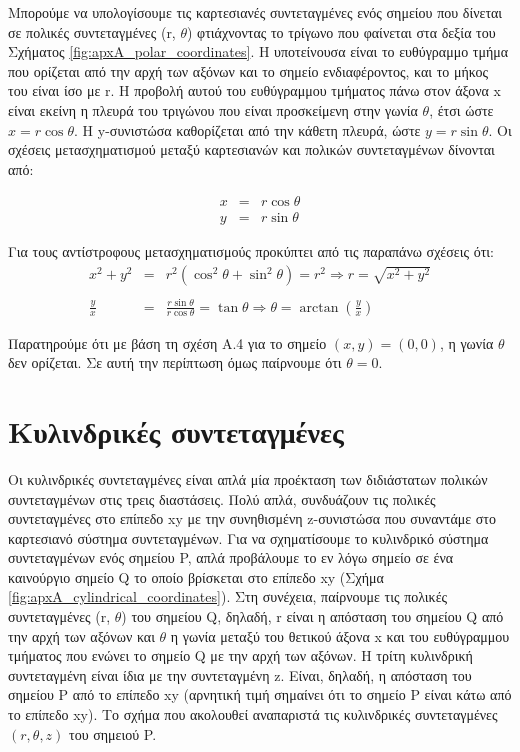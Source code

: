 Μπορούμε να υπολογίσουμε τις καρτεσιανές συντεταγμένες ενός σημείου που δίνεται σε πολικές συντεταγμένες (r, $\theta$) φτιάχνοντας το τρίγωνο που φαίνεται στα δεξία του Σχήματος \ref{fig:apxA_polar_coordinates}.  
Η υποτείνουσα είναι το ευθύγραμμο τμήμα που ορίζεται από την αρχή των αξόνων και το σημείο ενδιαφέροντος, και το μήκος του είναι ίσο με r. Η προβολή αυτού του ευθύγραμμου τμήματος πάνω στον άξονα x είναι εκείνη η πλευρά του τριγώνου που είναι προσκείμενη στην γωνία $\theta$, έτσι ώστε $x=r \cos \theta$. Η y-συνιστώσα καθορίζεται από την κάθετη πλευρά, ώστε $y=r \sin \theta$. Οι σχέσεις μετασχηματισμού μεταξύ καρτεσιανών και πολικών συντεταγμένων δίνονται από:

\begin{eqnarray}
    x &=& r \cos \theta \\
    y &=& r \sin \theta 
\end{eqnarray}

Για τους αντίστροφους μετασχηματισμούς προκύπτει από τις παραπάνω σχέσεις ότι:
\begin{eqnarray}
    x^2 + y^2 &=& r^2 (\cos^2 \theta + \sin^2 \theta) = r^2 \Rightarrow r = \sqrt{x^2 + y^2} \\ \nonumber \\
    \frac{y}{x} &=& \frac{r \sin \theta}{r \cos \theta} = \tan \theta \Rightarrow \theta = \arctan \left( \frac{y}{x} \right)
\end{eqnarray}

Παρατηρούμε ότι με βάση τη σχέση Α.4 για το σημείο $(x,y) = (0,0)$, η γωνία $\theta$ δεν ορίζεται. Σε αυτή την περίπτωση όμως παίρνουμε ότι $\theta = 0$.


\section{Κυλινδρικές συντεταγμένες}
Οι κυλινδρικές συντεταγμένες είναι απλά μία προέκταση των διδιάστατων πολικών συντεταγμένων στις τρεις διαστάσεις. Πολύ απλά, συνδυάζουν τις πολικές συντεταγμένες στο επίπεδο xy με την συνηθισμένη z-συνιστώσα που συναντάμε στο καρτεσιανό σύστημα συντεταγμένων. Για να σχηματίσουμε το κυλινδρικό σύστημα συντεταγμένων ενός σημείου P, απλά προβάλουμε το εν λόγω σημείο σε ένα καινούργιο σημείο Q το οποίο βρίσκεται στο επίπεδο xy (Σχήμα \ref{fig:apxA_cylindrical_coordinates}). Στη συνέχεια, παίρνουμε τις πολικές συντεταγμένες (r, $\theta$) του σημείου Q, δηλαδή, r είναι η απόσταση του σημείου Q από την αρχή των αξόνων και $\theta$ η γωνία μεταξύ του θετικού άξονα x και του ευθύγραμμου τμήματος που ενώνει το σημείο Q με την αρχή των αξόνων. Η τρίτη κυλινδρική συντεταγμένη είναι ίδια με την συντεταγμένη z. Είναι, δηλαδή, η απόσταση του σημείου P από το επίπεδο xy (αρνητική τιμή σημαίνει ότι το σημείο P είναι κάτω από το επίπεδο xy). Το σχήμα που ακολουθεί αναπαριστά τις κυλινδρικές συντεταγμένες $(r, \theta, z)$ του σημειού P.

